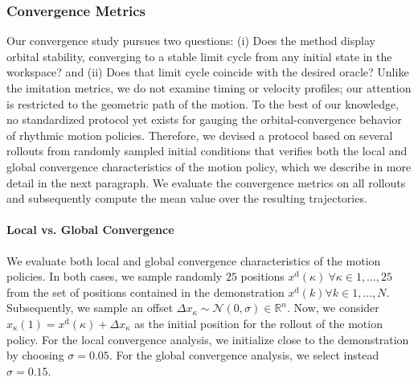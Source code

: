 \subsubsection{Convergence Metrics}
Our convergence study pursues two questions: (i) Does the method display orbital stability, converging to a stable limit cycle from any initial state in the workspace? and (ii) Does that limit cycle coincide with the desired oracle? Unlike the imitation metrics, we do not examine timing or velocity profiles; our attention is restricted to the geometric path of the motion. To the best of our knowledge, no standardized protocol yet exists for gauging the orbital-convergence behavior of rhythmic motion policies. Therefore, we devised a protocol based on several rollouts from randomly sampled initial conditions that verifies both the local and global convergence characteristics of the motion policy, which we describe in more detail in the next paragraph.
We evaluate the convergence metrics on all rollouts and subsequently compute the mean value over the resulting trajectories.

\paragraph{Local vs. Global Convergence}
We evaluate both local and global convergence characteristics of the motion policies.
In both cases, we sample randomly $25$ positions $x^\mathrm{d}(\kappa) \: \forall \kappa \in 1,\dots,25$ from the set of positions contained in the demonstration $x^\mathrm{d}(k) \forall k \in 1,\dots,N$. Subsequently, we sample an offset $\Delta x_\kappa \sim \mathcal{N}(0,\sigma) \in \mathbb{R}^n$. Now, we consider $x_\kappa(1) = x^\mathrm{d}(\kappa) + \Delta x_\kappa$ as the initial position for the rollout of the motion policy.
For the local convergence analysis, we initialize close to the demonstration by choosing $\sigma = 0.05$. For the global convergence analysis, we select instead $\sigma = 0.15$.

